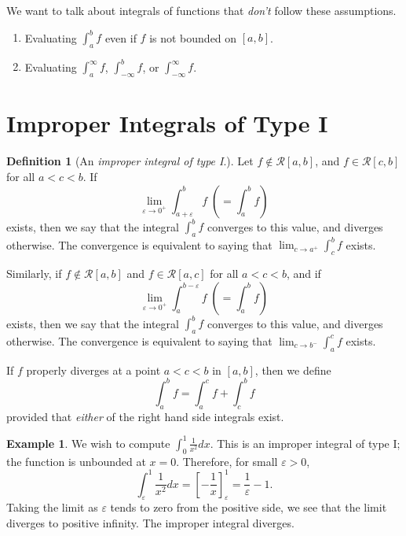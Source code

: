 \documentclass[15pt,a4paper]{book}
\theoremstyle{definition}
\newtheorem{definition}[theorem]{Definition}
\newtheorem{example}[theorem]{Example}
\newcommand{\eax}[1]{\emph{#1}\index{#1}} %
\newcommand{\cR}{\mathcal{R}}
\begin{document}
We want to talk about integrals of functions that \textit{don't} follow these assumptions.
\begin{enumerate}
    \item Evaluating $\int_{a}^{b} f$ even if $f$ is not bounded on $[a,b]$.
    \item Evaluating $\int_{a}^{\infty} f$, $\int_{-\infty}^{b} f$, or $\int_{-\infty}^{\infty} f$.
\end{enumerate}

\section{Improper Integrals of Type I}

\begin{definition}[An \eax{improper integral of type I}.]
    Let $f \notin \cR[a,b]$, and $f \in \cR[c,b]$ for all $a < c < b$. If
    \begin{equation}
        \lim_{\varepsilon \to 0^{+}} \int_{a+\varepsilon}^{b} f \; \left( = \int_{a}^{b} f \right)
    \end{equation}
    exists, then we say that the integral $\int_{a}^{b} f$ converges to this value, and diverges otherwise. The convergence is equivalent to saying that $\lim_{c \to a^{+}} \int_{c}^{b} f$ exists.

    Similarly, if $f \notin \cR[a,b]$ and $f \in \cR[a,c]$ for all $a < c < b$, and if
    \begin{equation}
        \lim_{\varepsilon \to 0^{+}} \int_{a}^{b-\varepsilon} f \; \left( = \int_{a}^{b} f \right)
    \end{equation}
    exists, then we say that the integral $\int_{a}^{b} f$ converges to this value, and diverges otherwise. The convergence is equivalent to saying that $\lim_{c \to b^{-}} \int_{a}^{c} f$ exists.

    If $f$ properly diverges at a point $a < c < b$ in $[a,b]$, then we define
    \begin{equation}
        \int_{a}^{b} f = \int_{a}^{c} f + \int_{c}^{b} f
    \end{equation}
    provided that \textit{either} of the right hand side integrals exist.
\end{definition}

\begin{example}
    We wish to compute $\int_{0}^{1} \frac{1}{x^{2}} dx$. This is an improper integral of type I; the function is unbounded at $x = 0$. Therefore, for small $\varepsilon > 0$,
    \begin{equation}
        \int_{\varepsilon}^{1} \frac{1}{x^{2}} dx = \left[ -\frac{1}{x} \right]_{\varepsilon}^{1} = \frac{1}{\varepsilon} - 1.
    \end{equation}
    Taking the limit as $\varepsilon$ tends to zero from the positive side, we see that the limit diverges to positive infinity. The improper integral diverges.
\end{example}
\end{document}
